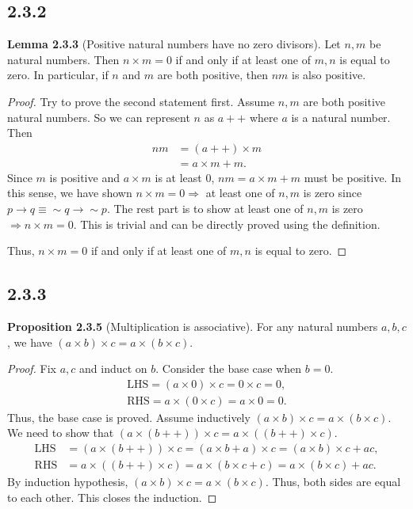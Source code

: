 \documentclass[12pt, letter]{article}
\begin{document}
\subsection*{2.3.2}
\textbf{Lemma 2.3.3} (Positive natural numbers have no zero divisors). Let $n,m$ be natural numbers. Then $n\times m=0$ if and only if at least one of $m,n$ is equal to zero. In particular, if $n$ and $m$ are both positive, then $nm$ is also positive.
\begin{proof}
    Try to prove the second statement first. Assume $n,m$ are both positive natural numbers. So we can represent $n$ as $a++$ where $a$ is a natural number. Then 
    \begin{equation*}
        \begin{aligned}
            nm&=(a++)\times m\\
            &=a\times m+m.
        \end{aligned}
    \end{equation*}
    Since $m$ is positive and $a\times m$ is at least 0, $nm=a\times m+m$ must be positive. In this sense, we have shown $n\times m=0\Rightarrow$ at least one of $n,m$ is zero since\\ 
    $p\rightarrow q\equiv \sim q\rightarrow \sim p$. The rest part is to show at least one of $n,m$ is zero $\Rightarrow n\times m=0$. This is trivial and can be directly proved using the definition. 

    Thus, $n\times m=0$ if and only if at least one of $m,n$ is equal to zero.
\end{proof}
\subsection*{2.3.3}
\textbf{Proposition 2.3.5} (Multiplication is associative). For any natural numbers $a,b,c$, we have $(a\times b)\times c=a\times (b\times c)$.
\begin{proof}
    Fix $a,c$ and induct on $b$. Consider the base case when $b=0$. 
    \begin{equation*}
        \begin{aligned}
            \text{LHS}=(a\times 0)\times c=0\times c=0,\\
            \text{RHS}=a\times(0\times c)=a\times 0=0.
        \end{aligned}
    \end{equation*}
    Thus, the base case is proved. Assume inductively $(a\times b)\times c=a\times(b\times c)$. We need to show that $(a\times(b++))\times c=a\times((b++)\times c)$.
    \begin{equation*}
        \begin{aligned}
            \text{LHS}&=(a\times(b++))\times c=(a\times b+a)\times c=(a\times b)\times c+ac,\\
            \text{RHS}&=a\times ((b++)\times c)=a\times(b\times c+c)=a\times (b\times c)+ac.
        \end{aligned}
    \end{equation*}
    By induction hypothesis, $(a\times b)\times c=a\times(b\times c)$. Thus, both sides are equal to each other. This closes the induction.
\end{proof}
\end{document}
